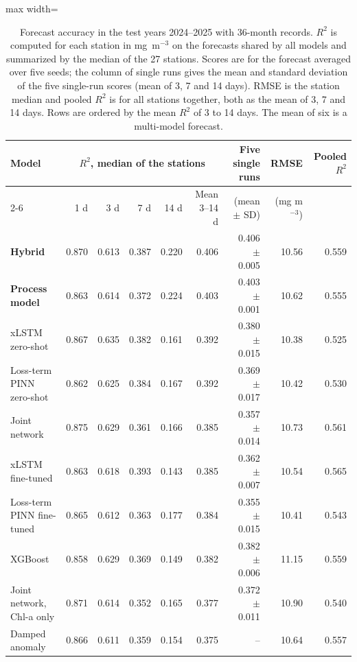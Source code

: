 \begin{table}[tbp]
\centering
\caption{Forecast accuracy in the test years 2024--2025 with 36-month records. $R^2$ is computed for each station in mg~m$^{-3}$ on the forecasts shared by all models and summarized by the median of the 27 stations. Scores are for the forecast averaged over five seeds; the column of single runs gives the mean and standard deviation of the five single-run scores (mean of 3, 7 and 14 days). RMSE is the station median and pooled $R^2$ is for all stations together, both as the mean of 3, 7 and 14 days. Rows are ordered by the mean $R^2$ of 3 to 14 days. The mean of six is a multi-model forecast.}
\label{tab:accuracy}
\footnotesize
\setlength{\tabcolsep}{4pt}
\begin{adjustbox}{max width=\textwidth}
\begin{tabular}{lrrrrrrrr}
\toprule
Model & \multicolumn{5}{c}{$R^2$, median of the stations} & Five single runs & RMSE & Pooled $R^2$ \\ \cmidrule(lr){2-6}
 & 1 d & 3 d & 7 d & 14 d & Mean 3--14 d & (mean $\pm$ SD) & (mg m$^{-3}$) & \\
\midrule
\textbf{Hybrid} & 0.870 & 0.613 & 0.387 & 0.220 & 0.406 & 0.406 $\pm$ 0.005 & 10.56 & 0.559 \\
\textbf{Process model} & 0.863 & 0.614 & 0.372 & 0.224 & 0.403 & 0.403 $\pm$ 0.001 & 10.62 & 0.555 \\
xLSTM zero-shot & 0.867 & 0.635 & 0.382 & 0.161 & 0.392 & 0.380 $\pm$ 0.015 & 10.38 & 0.525 \\
Loss-term PINN zero-shot & 0.862 & 0.625 & 0.384 & 0.167 & 0.392 & 0.369 $\pm$ 0.017 & 10.42 & 0.530 \\
Joint network & 0.875 & 0.629 & 0.361 & 0.166 & 0.385 & 0.357 $\pm$ 0.014 & 10.73 & 0.561 \\
xLSTM fine-tuned & 0.863 & 0.618 & 0.393 & 0.143 & 0.385 & 0.362 $\pm$ 0.007 & 10.54 & 0.565 \\
Loss-term PINN fine-tuned & 0.865 & 0.612 & 0.363 & 0.177 & 0.384 & 0.355 $\pm$ 0.015 & 10.41 & 0.543 \\
XGBoost & 0.858 & 0.629 & 0.369 & 0.149 & 0.382 & 0.382 $\pm$ 0.006 & 11.15 & 0.559 \\
Joint network, Chl-a only & 0.871 & 0.614 & 0.352 & 0.165 & 0.377 & 0.372 $\pm$ 0.011 & 10.90 & 0.540 \\
Damped anomaly & 0.866 & 0.611 & 0.359 & 0.154 & 0.375 & -- & 10.64 & 0.557 \\

\end{tabular}
\end{adjustbox}
\end{table}
